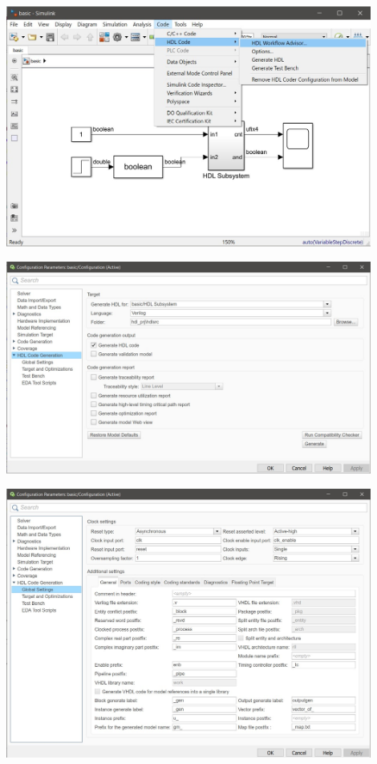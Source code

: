
\usetikzlibrary{arrows.meta}
\usetikzlibrary{decorations.text}    


\begin{page}%
	\includegraphics[width=12cm]{fig1.jpg}%
\end{page}

\begin{page}%
	\includegraphics[width=12cm]{fig2.jpg}%
\end{page}

\begin{page}%
	\includegraphics[width=12cm]{fig3.jpg}%
\end{page}

